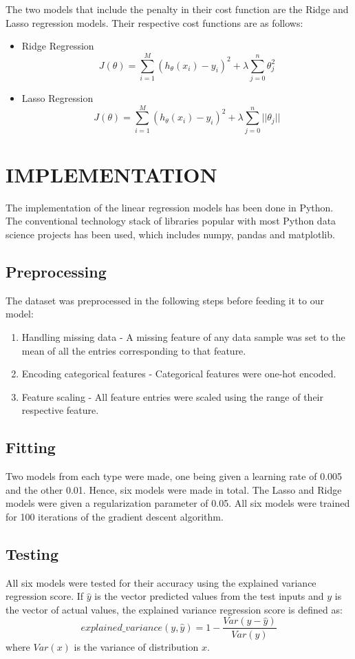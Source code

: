 \documentclass[letterpaper, 10 pt, conference]{ieeeconf}  %
\begin{document}
The two models that include the penalty in their cost function are the Ridge and Lasso regression models. Their respective cost functions are as follows:
\begin{itemize}
  \item Ridge Regression
    \[J(\theta) = \sum_{i=1}^{M}(h_\theta(x_i) - y_i)^2 + \lambda \sum_{j=0}^{n}\theta_j^2\]
  \item Lasso Regression
    \[J(\theta) = \sum_{i=1}^{M}(h_\theta(x_i) - y_i)^2 + \lambda \sum_{j=0}^{n}||\theta_j||\]
\end{itemize}

\section{IMPLEMENTATION}
The implementation of the linear regression models has been done in Python. The conventional technology stack of libraries popular with most Python data science projects has been used, which includes numpy, pandas and matplotlib.

\subsection{Preprocessing}
The dataset was preprocessed in the following steps before feeding it to our model:
\begin{enumerate}
    \item Handling missing data - A missing feature of any data sample was set to the mean of all the entries corresponding to that feature.
    \item Encoding categorical features - Categorical features were one-hot encoded.
    \item Feature scaling - All feature entries were scaled using the range of their respective feature.
\end{enumerate}

\subsection{Fitting}
Two models from each type were made, one being given a learning rate of 0.005 and the other 0.01. Hence, six models were made in total. The Lasso and Ridge models were given a regularization parameter of 0.05. All six models were trained for 100 iterations of the gradient descent algorithm.

\subsection{Testing}
All six models were tested for their accuracy using the explained variance regression score. If $\hat{y}$ is the vector predicted values from the test inputs and $y$ is the vector of actual values, the explained variance regression score is defined as:
\[explained\_variance(y, \hat{y}) = 1-\frac{Var(y-\hat{y})}{Var(y)}\]
where $Var(x)$ is the variance of distribution $x$.
\end{document}
